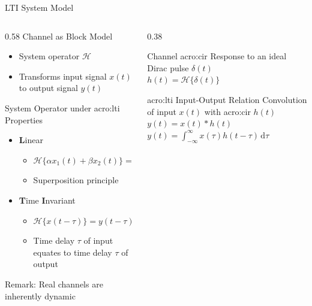 
\begin{frame}{LTI System Model}
  \begin{columns}[T,onlytextwidth]
    \begin{column}{0.58\textwidth}
      Channel as Block Model\\
      \vspace{1em}
      
      \begin{itemize}
        \item System operator $\mathcal{H}$
        \item Transforms input signal $x(t)$ to output signal $y(t)$
      \end{itemize}
      \vfill
      System Operator under \gls{acro:lti} Properties\\
      \begin{itemize}
        \item \textbf{L}inear
          \begin{itemize}
            \item $\mathcal{H}\{\alpha x_1(t) + \beta x_2(t)\} = \alpha \mathcal{H}\{x_1(t)\} + \beta \mathcal{H}\{x_2(t)\}$
            \item Superposition principle
          \end{itemize}
        \item \textbf{T}ime \textbf{I}nvariant
          \begin{itemize}
            \item $\mathcal{H}\{x(t - \tau)\}=y(t-\tau)$
            \item Time delay $\tau$ of input equates to time delay $\tau$ of output
          \end{itemize}
      \end{itemize}
      \alert{Remark:} Real channels are inherently dynamic
    \end{column}
    \begin{column}{0.38\textwidth}
      \begin{block}{Channel \gls{acro:cir}}
        Response to an ideal Dirac pulse $\delta(t)$\\
        \vspace{0.5em}
        \centering
        $h(t) = \mathcal{H}\{\delta(t)\}$
      \end{block}
      \begin{block}{\gls{acro:lti} Input-Output Relation}
        Convolution of input $x(t)$ with \gls{acro:cir} $h(t)$\\
        \vspace{0.5em}
        \centering
        $y(t) = x(t) * h(t)$ \\[0.2cm]
        $y(t) = \int_{-\infty}^{\infty} x(\tau) h(t - \tau) \,\mathrm{d}\tau$
      \end{block}
    \end{column}
  \end{columns}
\end{frame}

